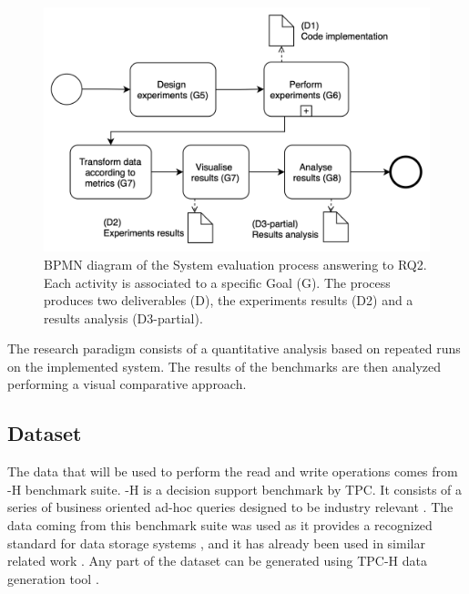 \begin{figure}[!ht]
    \begin{center}
      \includegraphics[width=\textwidth]{figures/3-method/research_process_rq2.png}
    \caption{\gls{BPMN} diagram of the System evaluation process answering to RQ2. Each activity is associated to a specific Goal (\gls{G}). The process produces two deliverables (\gls{D}), the experiments results (D2) and a results analysis (D3-partial).}
    \label{fig:DevProcessRQ2}
    \end{center}
\end{figure}

The research paradigm consists of a quantitative analysis based on repeated runs on the implemented system. The results of the benchmarks are then analyzed performing a visual comparative approach.

\subsection{Dataset}
\label{subsec:dataset}

The data that will be used to perform the read and write operations comes from -H benchmark suite\cite{TPCHHomepage}. -H is a decision support benchmark by \gls{TPC}. It consists of a series of business oriented ad-hoc queries designed to be industry relevant \cite{transactionprocessingperformancecounciltpcTPCH_v301pdf1993}. The data coming from this benchmark suite was used as
it provides a recognized standard for data storage systems \cite{TPC_benchmarks_2000}, and it has already been used in similar related work \cite{raasveldtDuckDBEmbeddableAnalytical2019, }. Any part of the dataset can be generated using TPC-H data generation tool \cite{TPCCurrentSpecs}.

